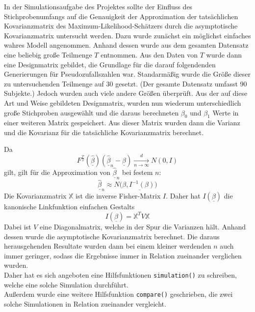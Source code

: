 In der Simulationsaufgabe des Projektes sollte der Einfluss des Stichprobenumfangs auf die Genauigkeit der Approximation der tats\"achlichen Kovarianzmatrix des Maximum-Likelihood-Sch\"atzers durch die asymptotische Kovarianzmatrix untersucht werden.
Dazu wurde zun\"achst ein m\"oglichst einfaches wahres Modell angenommen. Anhand dessen wurde aus dem gesamten Datensatz eine beliebig gro\ss{}e Teilmenge $T$ entnommen. Aus den Daten von $T$ wurde dann eine Designmatrix gebildet, die Grundlage f\"ur die darauf folgendenden Generierungen f\"ur Pseudozufallszahlen war. Standarm\"a\ss{}ig wurde die Gr\"o\ss{}e dieser zu untersuchenden Teilmenge auf $30$ gesetzt. (Der gesamte Datensatz umfasst 90 Subjekte.) Jedoch wurden auch viele andere Gr\"o\ss{}en \"uberpr\"uft. Aus der auf diese Art und Weise gebildeten Designmatrix, wurden nun wiederum unterschiedlich gro\ss{}e Stichproben ausgew\"ahlt und die daraus berechneten $\beta_0$ und $\beta_1$ Werte in einer weiteren Matrix gespeichert. Aus dieser Matrix wurden dann die Varianz und die Kovarianz f\"ur die tats\"achliche Kovarianzmatrix berechnet. \\
\par\smallskip
Da
\begin{equation}
F^{\frac{T}{2}}(\underline{\hat{\beta}}) (\underline{\hat{\beta}}_n - \underline{\beta})
\xrightarrow[n \rightarrow \infty]{d}
N(0,I)
\end{equation}
gilt, gilt f\"ur die Approximation von $\underline{\hat{\beta}}_n$ bei festem $n$:
\begin{equation}
\underline{\hat{\beta}}_n \approx N(\underline{\beta, I^{-1}(\beta))}
\end{equation}
Die Kovarianzmatrix $\mathbb{X}$ ist die inverse Fisher-Matrix $I$. Daher hat $I(\underline{\beta})$ die kanonische Linkfunktion einfachen Gestalts
\begin{equation}
I(\underline{\beta}) = \mathbb{X}^T V \mathbb{X}
\end{equation}
Dabei ist $V$ eine Diagonalmatrix, welche in der Spur die Varianzen h\"alt.
Anhand dessen wurde die asymptotische Kovarianzmatrix berechnet.
Die daraus herausgehenden Resultate wurden dann bei einem kleiner werdenden $n$ auch immer geringer, sodass die Ergebnisse immer in Relation zueinander verglichen wurden. \\
Daher hat es sich angeboten eine Hilfsfunktionen \texttt{simulation()} zu schreiben, welche eine solche Simulation durchf\"uhrt. \\
Au\ss{}erdem wurde eine weitere Hilfsfunktion \texttt{compare()} geschrieben, die zwei solche Simulationen in Relation zueinander vergleicht. 
